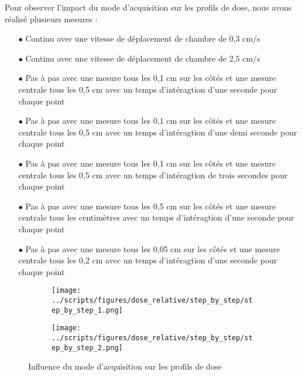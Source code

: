 \documentclass{article}
\begin{document}
Pour observer l'impact du mode d'acquisition sur les profils de dose, nous avons réalisé plusieurs mesures :

\begin{itemize}
  \item[$\bullet$] Continu avec une vitesse de déplacement de chambre de 0,3 cm/s
  \item[$\bullet$] Continu avec une vitesse de déplacement de chambre de 2,5 cm/s
  \item[$\bullet$] Pas à pas avec une mesure tous les 0,1 cm sur les côtés et une mesure centrale tous les 0,5 cm avec un temps d'intéragtion d'une seconde pour chaque point
  \item[$\bullet$] Pas à pas avec une mesure tous les 0,1 cm sur les côtés et une mesure centrale tous les 0,5 cm avec un temps d'intéragtion d'une demi seconde pour chaque point
  \item[$\bullet$] Pas à pas avec une mesure tous les 0,1 cm sur les côtés et une mesure centrale tous les 0,5 cm avec un temps d'intéragtion de trois secondes pour chaque point
  \item[$\bullet$] Pas à pas avec une mesure tous les 0,5 cm sur les côtés et une mesure centrale tous les centimètres avec un temps d'intéragtion d'une seconde pour chaque point
  \item[$\bullet$] Pas à pas avec une mesure tous les 0,05 cm sur les côtés et une mesure centrale tous les 0,2 cm avec un temps d'intéragtion d'une seconde pour chaque point
\end{itemize}

\begin{figure}[h]
  \centering
  \begin{subfigure}{\textwidth}
    \centering
    \texttt{[image: ../scripts/figures/dose\_relative/step\_by\_step/step\_by\_step\_1.png]}
  \end{subfigure}
  \vspace{0.5cm}
  \begin{subfigure}{\textwidth}
    \centering
    \texttt{[image: ../scripts/figures/dose\_relative/step\_by\_step/step\_by\_step\_2.png]}
  \end{subfigure}
  \caption{Influence du mode d'acquisition sur les profils de dose}
  \label{fig_mode_acquisition}
\end{figure}
\end{document}
